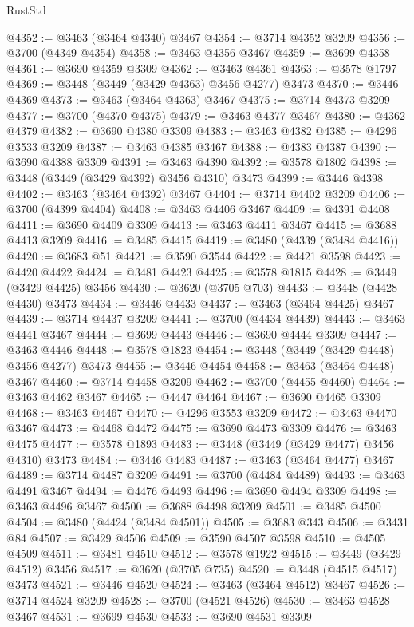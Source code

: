 \begin{lexlean}{RustStd}
\begin{coremodule}
{\begin{coremodule}
{{{{{{{{{{{{{{{{{{{{{{{{{{{{{{{{{{{{{{{{{{{{{{{{{{{{{{{{{{{{{{{{{{{{{{{{{{{{{{{{{{{{{@4352 := @3463 (@3464 @4340) @3467
@4354 := @3714 @4352 @3209
@4356 := @3700 (@4349 @4354)
@4358 := @3463 @4356 @3467
@4359 := @3699 @4358
@4361 := @3690 @4359 @3309
@4362 := @3463 @4361
@4363 := @3578 @1797
@4369 := @3448 (@3449 (@3429 @4363) @3456 @4277) @3473
@4370 := @3446 @4369
@4373 := @3463 (@3464 @4363) @3467
@4375 := @3714 @4373 @3209
@4377 := @3700 (@4370 @4375)
@4379 := @3463 @4377 @3467
@4380 := @4362 @4379
@4382 := @3690 @4380 @3309
@4383 := @3463 @4382
@4385 := @4296 @3533 @3209
@4387 := @3463 @4385 @3467
@4388 := @4383 @4387
@4390 := @3690 @4388 @3309
@4391 := @3463 @4390
@4392 := @3578 @1802
@4398 := @3448 (@3449 (@3429 @4392) @3456 @4310) @3473
@4399 := @3446 @4398
@4402 := @3463 (@3464 @4392) @3467
@4404 := @3714 @4402 @3209
@4406 := @3700 (@4399 @4404)
@4408 := @3463 @4406 @3467
@4409 := @4391 @4408
@4411 := @3690 @4409 @3309
@4413 := @3463 @4411 @3467
@4415 := @3688 @4413 @3209
@4416 := @3485 @4415
@4419 := @3480 (@4339 (@3484 @4416))
@4420 := @3683 @51
@4421 := @3590 @3544
@4422 := @4421 @3598
@4423 := @4420 @4422
@4424 := @3481 @4423
@4425 := @3578 @1815
@4428 := @3449 (@3429 @4425) @3456
@4430 := @3620 (@3705 @703)
@4433 := @3448 (@4428 @4430) @3473
@4434 := @3446 @4433
@4437 := @3463 (@3464 @4425) @3467
@4439 := @3714 @4437 @3209
@4441 := @3700 (@4434 @4439)
@4443 := @3463 @4441 @3467
@4444 := @3699 @4443
@4446 := @3690 @4444 @3309
@4447 := @3463 @4446
@4448 := @3578 @1823
@4454 := @3448 (@3449 (@3429 @4448) @3456 @4277) @3473
@4455 := @3446 @4454
@4458 := @3463 (@3464 @4448) @3467
@4460 := @3714 @4458 @3209
@4462 := @3700 (@4455 @4460)
@4464 := @3463 @4462 @3467
@4465 := @4447 @4464
@4467 := @3690 @4465 @3309
@4468 := @3463 @4467
@4470 := @4296 @3553 @3209
@4472 := @3463 @4470 @3467
@4473 := @4468 @4472
@4475 := @3690 @4473 @3309
@4476 := @3463 @4475
@4477 := @3578 @1893
@4483 := @3448 (@3449 (@3429 @4477) @3456 @4310) @3473
@4484 := @3446 @4483
@4487 := @3463 (@3464 @4477) @3467
@4489 := @3714 @4487 @3209
@4491 := @3700 (@4484 @4489)
@4493 := @3463 @4491 @3467
@4494 := @4476 @4493
@4496 := @3690 @4494 @3309
@4498 := @3463 @4496 @3467
@4500 := @3688 @4498 @3209
@4501 := @3485 @4500
@4504 := @3480 (@4424 (@3484 @4501))
@4505 := @3683 @343
@4506 := @3431 @84
@4507 := @3429 @4506
@4509 := @3590 @4507 @3598
@4510 := @4505 @4509
@4511 := @3481 @4510
@4512 := @3578 @1922
@4515 := @3449 (@3429 @4512) @3456
@4517 := @3620 (@3705 @735)
@4520 := @3448 (@4515 @4517) @3473
@4521 := @3446 @4520
@4524 := @3463 (@3464 @4512) @3467
@4526 := @3714 @4524 @3209
@4528 := @3700 (@4521 @4526)
@4530 := @3463 @4528 @3467
@4531 := @3699 @4530
@4533 := @3690 @4531 @3309
}}}}}}}}}}}}}}}}}}}}}}}}}}}}}}}}}}}}}}}}}}}}}}}}}}}}}}}}}}}}}}}}}}}}}}}}}}}}}}}}}}}}}
\end{coremodule}}
\end{coremodule}
\end{lexlean}

